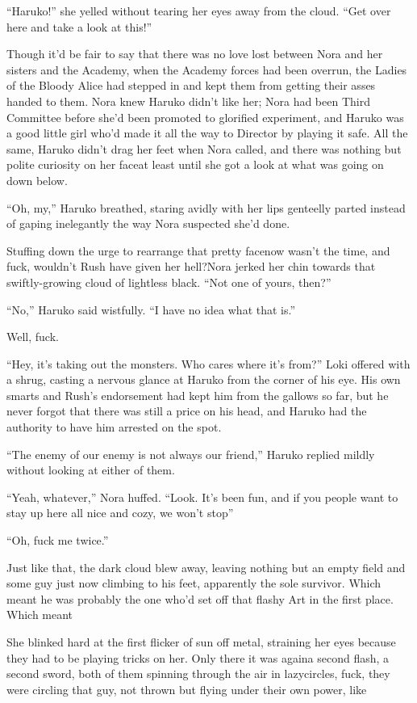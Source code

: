 ``Haruko!'' she yelled without tearing her eyes away from the cloud. ``Get over here and take a look at this!''

Though it'd be fair to say that there was no love lost between Nora and her sisters and the Academy, when the Academy forces had been overrun, the Ladies of the Bloody Alice had stepped in and kept them from getting their asses handed to them. Nora knew Haruko didn't like her; Nora had been Third Committee before she'd been promoted to glorified experiment, and Haruko was a good little girl who'd made it all the way to Director by playing it safe. All the same, Haruko didn't drag her feet when Nora called, and there was nothing but polite curiosity on her face\textemdash at least until she got a look at what was going on down below.

``Oh, my,'' Haruko breathed, staring avidly with her lips genteelly parted instead of gaping inelegantly the way Nora suspected she'd done.

Stuffing down the urge to rearrange that pretty face\textemdash now wasn't the time, and fuck, wouldn't Rush have given her hell?\textemdash Nora jerked her chin towards that swiftly-growing cloud of lightless black. ``Not one of yours, then?''

``No,'' Haruko said wistfully. ``I have no idea what that is.''

Well, fuck.

``Hey, it's taking out the monsters. Who cares where it's from?'' Loki offered with a shrug, casting a nervous glance at Haruko from the corner of his eye. His own smarts and Rush's endorsement had kept him from the gallows so far, but he never forgot that there was still a price on his head, and Haruko had the authority to have him arrested on the spot.

``The enemy of our enemy is not always our friend,'' Haruko replied mildly without looking at either of them.

``Yeah, whatever,'' Nora huffed. ``Look. It's been fun, and if you people want to stay up here all nice and cozy, we won't stop\textemdash''

``Oh, fuck me twice.''

Just like that, the dark cloud blew away, leaving nothing but an empty field and some guy just now climbing to his feet, apparently the sole survivor. Which meant he was probably the one who'd set off that flashy Art in the first place. Which meant\textemdash 

She blinked hard at the first flicker of sun off metal, straining her eyes because they had to be playing tricks on her. Only there it was again\textemdash a second flash, a second sword, both of them spinning through the air in lazy\textemdash circles, fuck, they were circling that guy, not thrown but flying under their own power, like\textemdash 

